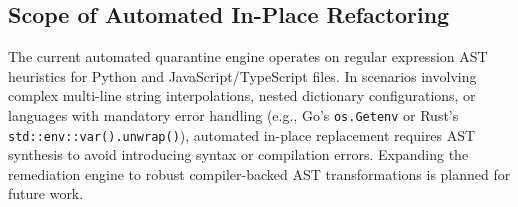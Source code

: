 \subsection{Scope of Automated In-Place Refactoring}
The current automated quarantine engine operates on regular expression AST heuristics for Python and JavaScript/TypeScript files. In scenarios involving complex multi-line string interpolations, nested dictionary configurations, or languages with mandatory error handling (e.g., Go's \texttt{os.Getenv} or Rust's \texttt{std::env::var().unwrap()}), automated in-place replacement requires AST synthesis to avoid introducing syntax or compilation errors. Expanding the remediation engine to robust compiler-backed AST transformations is planned for future work.

